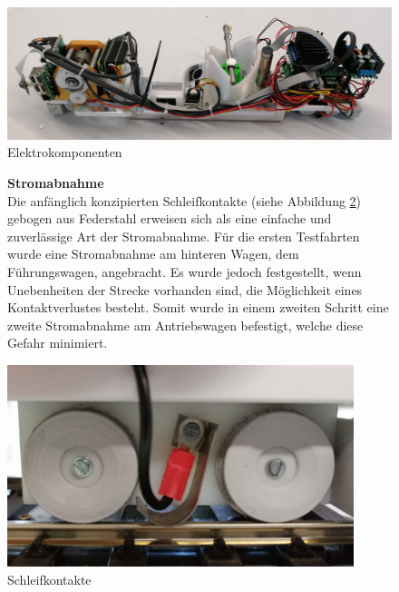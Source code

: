 \documentclass[../../main.tex]{subfiles}
\begin{document}
\begin{figure}[H]
  \centering
  \includegraphics[width=1\textwidth]{lokomotive3.PNG}
  \caption {Elektrokomponenten}
  \label{fig:elektrokomponenten}
\end{figure}

\begin{figure}[H]
  \begin{minipage}{.5\textwidth}
    \textbf{Stromabnahme}\\
    Die anfänglich konzipierten Schleifkontakte (siehe Abbildung \ref{fig:schleifkontakte}) gebogen aus Federstahl erweisen sich als eine einfache und zuverlässige Art der Stromabnahme. Für die ersten Testfahrten wurde eine Stromabnahme am hinteren Wagen, dem Führungswagen, angebracht. Es wurde jedoch festgestellt, wenn Unebenheiten der Strecke vorhanden sind, die Möglichkeit eines Kontaktverlustes besteht. Somit wurde in einem zweiten Schritt eine zweite Stromabnahme am Antriebswagen befestigt, welche diese Gefahr minimiert.\\
   \end{minipage}
  \begin{minipage}{.5\textwidth}
    \flushright
    \includegraphics[width=0.9\textwidth]{schleifkontakt.PNG}
    \caption {Schleifkontakte}
    \label{fig:schleifkontakte}
    \end{minipage}
\end{figure}
\end{document}
